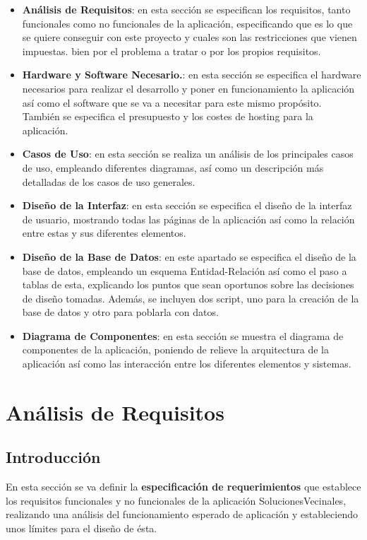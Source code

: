 \begin{itemize}
	\item \textbf{Análisis de Requisitos}: en esta sección se especifican los requisitos, tanto funcionales como no funcionales de la aplicación, especificando que es lo que se quiere conseguir con este proyecto y cuales son las restricciones que vienen impuestas. bien por el problema a tratar o por los propios requisitos.
	
	\item \textbf{Hardware y Software Necesario.}: en esta sección se especifica el hardware necesarios para realizar el desarrollo y poner en funcionamiento la aplicación así como el software que se va a necesitar para este mismo propósito. También se especifica el presupuesto y los costes de hosting para la aplicación.
	
	\item \textbf{Casos de Uso}: en esta sección se realiza un análisis de los principales casos de uso, empleando diferentes diagramas, así como un descripción más detalladas de los casos de uso generales.
	
	\item \textbf{Diseño de la Interfaz}: en esta sección se especifica el diseño de la interfaz de usuario, mostrando todas las páginas de la aplicación así como la relación entre estas y sus diferentes elementos.
	
	\item \textbf{Diseño de la Base de Datos}: en este apartado se especifica el diseño de la base de datos, empleando un esquema Entidad-Relación así como el paso a tablas de esta, explicando los puntos que sean oportunos sobre las decisiones de diseño tomadas. Además, se incluyen dos script, uno para la creación de la base de datos y otro para poblarla con datos.
	
	\item \textbf{Diagrama de Componentes}: en esta sección se muestra el diagrama de componentes de la aplicación, poniendo de relieve la arquitectura de la aplicación así como las interacción entre los diferentes elementos y sistemas.
\end{itemize}



\section{Análisis de Requisitos}

\subsection{Introducción}
En esta sección se va definir la \textbf{especificación de requerimientos} que establece los requisitos funcionales y no funcionales de la aplicación SolucionesVecinales, realizando una análisis del funcionamiento esperado de aplicación y estableciendo unos límites para el diseño de ésta.

